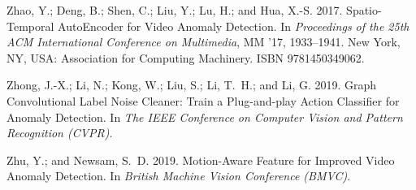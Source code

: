 \documentclass[letterpaper]{article} \usepackage{aaai23}  \usepackage{times}  \usepackage{helvet}  \usepackage{courier}  \usepackage[hyphens]{url}  \usepackage{graphicx} \urlstyle{rm} \def\UrlFont{\rm}  \usepackage{natbib}  \usepackage{caption} \frenchspacing  \setlength{\pdfpagewidth}{8.5in}  \setlength{\pdfpageheight}{11in}  \usepackage{algorithm}
\begin{document}
\begin{thebibliography}{50}
Zhao, Y.; Deng, B.; Shen, C.; Liu, Y.; Lu, H.; and Hua, X.-S. 2017.
\newblock Spatio-Temporal AutoEncoder for Video Anomaly Detection.
\newblock In \emph{Proceedings of the 25th ACM International Conference on
  Multimedia}, MM '17, 1933–1941. New York, NY, USA: Association for
  Computing Machinery.
\newblock ISBN 9781450349062.

Zhong, J.-X.; Li, N.; Kong, W.; Liu, S.; Li, T.~H.; and Li, G. 2019.
\newblock Graph Convolutional Label Noise Cleaner: Train a Plug-and-play Action
  Classifier for Anomaly Detection.
\newblock In \emph{The IEEE Conference on Computer Vision and Pattern
  Recognition (CVPR)}.

Zhu, Y.; and Newsam, S.~D. 2019.
\newblock Motion-Aware Feature for Improved Video Anomaly Detection.
\newblock In \emph{British Machine Vision Conference (BMVC)}.

\end{thebibliography}
 
\end{document}
